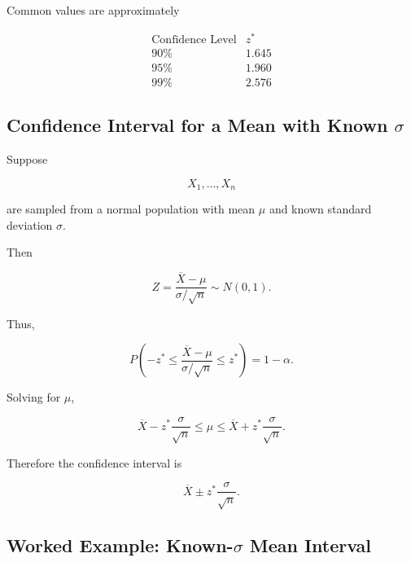 Common values are approximately

\[
\begin{array}{c|c}
\text{Confidence Level} & z^*\\
\hline
90\% & 1.645\\
95\% & 1.960\\
99\% & 2.576
\end{array}
\]

\subsection{Confidence Interval for a Mean with Known \(\sigma\)}
\label{subsec:ci-mean-known-sigma}

Suppose

\[
X_1,\ldots,X_n
\]

are sampled from a normal population with mean \(\mu\) and known
standard deviation \(\sigma\).

Then

\[
\boxed{
Z
=
\frac{
\overline{X}-\mu
}{
\sigma/\sqrt{n}
}
\sim
N(0,1).
}
\]

Thus,

\[
P
\left(
-z^*
\leq
\frac{
\overline{X}-\mu
}{
\sigma/\sqrt{n}
}
\leq
z^*
\right)
=
1-\alpha.
\]

Solving for \(\mu\),

\[
\boxed{
\overline{X}
-
z^*
\frac{\sigma}{\sqrt{n}}
\leq
\mu
\leq
\overline{X}
+
z^*
\frac{\sigma}{\sqrt{n}}.
}
\]

Therefore the confidence interval is

\[
\boxed{
\overline{X}
\pm
z^*
\frac{\sigma}{\sqrt{n}}.
}
\]

\subsection{Worked Example: Known-\(\sigma\) Mean Interval}
\label{subsec:worked-known-sigma-ci}

